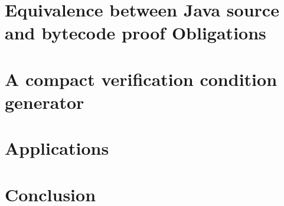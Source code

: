 \documentclass[book,10pt]{book}
\begin{document}
\chapter{Equivalence between Java source and bytecode proof Obligations}





\chapter{A compact verification condition generator}



\chapter{Applications} 

 
\chapter{Conclusion}



\end{document}
